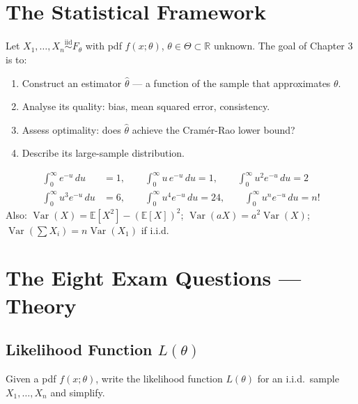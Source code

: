 \documentclass[11pt,a4paper]{article}
\newcommand{\iid}{\overset{\text{iid}}{\sim}}
\newcommand{\E}{\mathbb{E}}
\newcommand{\Var}{\operatorname{Var}}
\newcommand{\xn}{X_1, \ldots, X_n}
\begin{document}
\section{The Statistical Framework}

Let $\xn \iid F_\theta$ with pdf $f(x;\theta)$, $\theta \in \Theta \subset \mathbb{R}$ unknown. The goal of Chapter 3 is to:
\begin{enumerate}[leftmargin=2em]
  \item Construct an estimator $\hat\theta$ — a function of the sample that approximates $\theta$.
  \item Analyse its quality: bias, mean squared error, consistency.
  \item Assess optimality: does $\hat\theta$ achieve the Cramér-Rao lower bound?
  \item Describe its large-sample distribution.
\end{enumerate}

\begin{tcolorbox}[infobox, title={Formula Sheet (provided on exam)}]
\begin{align*}
\int_0^\infty e^{-u}\,du &= 1, \qquad
\int_0^\infty u\,e^{-u}\,du = 1, \qquad
\int_0^\infty u^2 e^{-u}\,du = 2\\
\int_0^\infty u^3 e^{-u}\,du &= 6, \qquad
\int_0^\infty u^4 e^{-u}\,du = 24, \qquad
\int_0^\infty u^n e^{-u}\,du = n!
\end{align*}
Also: $\Var(X) = \E[X^2]-(\E[X])^2$; $\Var(aX)=a^2\Var(X)$; $\Var(\sum X_i) = n\Var(X_1)$ if i.i.d.
\end{tcolorbox}

\section{The Eight Exam Questions — Theory}

\subsection{Likelihood Function $L(\theta)$}

\begin{tcolorbox}[questionbox, title={Question 1}]
Given a pdf $f(x;\theta)$, write the likelihood function $L(\theta)$ for an i.i.d.\ sample $\xn$ and simplify.
\end{tcolorbox}
\end{document}
